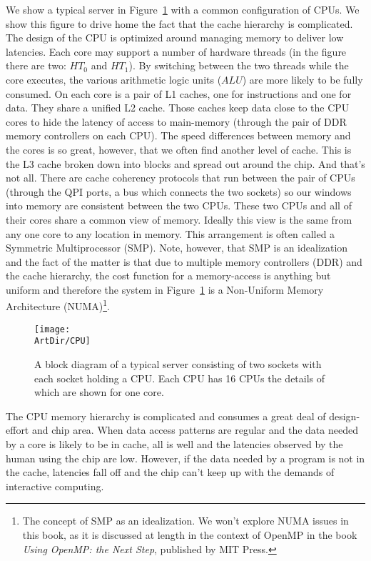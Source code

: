 We show a typical server in Figure~\ref{figure:CPU} with a common configuration of CPUs.   
We show this figure to drive home the fact that the cache hierarchy is complicated.  The design
of the CPU is optimized around managing memory to deliver low latencies.   Each core may
support a number of hardware threads (in the figure there are two: $HT_0$ and $HT_1$).  By switching between the two threads
while the core executes, the various arithmetic logic units ($ALU$) are more likely to be fully consumed.
On each core is a pair of L1 caches, one for instructions and one for
data.  They share a unified L2 cache.   Those caches keep data close to the CPU cores to hide the latency
of access to main-memory (through the pair of DDR memory controllers on each CPU).  The speed differences
between memory and the cores is so great, however, that we often find another level of cache.  This is the L3 
cache broken down into blocks and spread out around the chip.   And that's not all.  There are cache coherency
protocols that run between the pair of CPUs (through the QPI ports, a bus which connects the two sockets) 
so our windows into memory are
consistent between the two CPUs.  These two CPUs and all of their cores share a common view of memory. 
Ideally this view is the same from any one core to any location in memory. This arrangement is often 
called a Symmetric Multiprocessor (SMP).   Note, however, that SMP is an idealization and the fact of the matter
is that due to multiple memory controllers (DDR) and the cache hierarchy, the cost function for a memory-access is
anything but uniform and therefore the system in Figure~\ref{figure:CPU} is a Non-Uniform Memory Architecture (NUMA)\footnote{
The concept of SMP as an idealization. We won't explore NUMA issues in this book, as it is discussed at length in
the context of OpenMP in the book \emph{Using OpenMP: the Next Step}, published by MIT Press.}.

\begin{figure}[t]
\centerline{\texttt{[image: \\ArtDir/CPU]}}
\caption{A block diagram of a typical server consisting of two sockets with each socket holding a CPU. Each
CPU has 16 CPUs the details of which are shown for one core.}
\label{figure:CPU}
\end{figure}

The CPU memory hierarchy is complicated and consumes a great deal of design-effort and chip area.  
When data access patterns are regular and the data needed by a core is likely to be in cache, all is well and 
the latencies observed by the human using the chip are low.  However, if the data needed by a program is
not in the cache, latencies fall off and the chip can't keep up with the demands of interactive computing.

